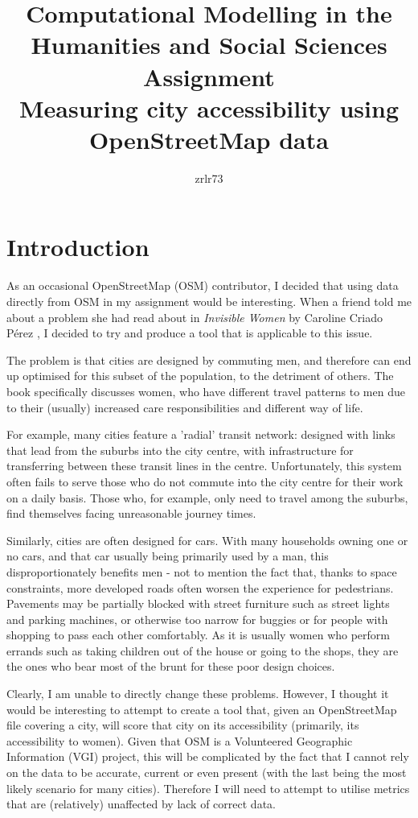 \documentclass[11pt]{article} %
\title{\vspace{-1.6cm}Computational Modelling in the Humanities and Social Sciences Assignment \\
	\vspace{0.5cm}\large Measuring city accessibility using OpenStreetMap data\vspace{-0.3cm}}
\author{zrlr73}
\date{} %
\begin{document}
\maketitle

\section{Introduction}

As an occasional OpenStreetMap (OSM) contributor, I decided that using data directly from OSM in my assignment would be interesting. When a friend told me about a problem she had read about in \textit{Invisible Women} by Caroline Criado Pérez \citeyear{Perez2019}, I decided to try and produce a tool that is applicable to this issue.

The problem is that cities are designed by commuting men, and therefore can end up optimised for this subset of the population, to the detriment of others. The book specifically discusses women, who have different travel patterns to men due to their (usually) increased care responsibilities and different way of life.

For example, many cities feature a 'radial' transit network: designed with links that lead from the suburbs into the city centre, with infrastructure for transferring between these transit lines in the centre. Unfortunately, this system often fails to serve those who do not commute into the city centre for their work on a daily basis. Those who, for example, only need to travel among the suburbs, find themselves facing unreasonable journey times.

Similarly, cities are often designed for cars. With many households owning one or no cars, and that car usually being primarily used by a man, this disproportionately benefits men - not to mention the fact that, thanks to space constraints, more developed roads often worsen the experience for pedestrians. Pavements may be partially blocked with street furniture such as street lights and parking machines, or otherwise too narrow for buggies or for people with shopping to pass each other comfortably. As it is usually women who perform errands such as taking children out of the house or going to the shops, they are the ones who bear most of the brunt for these poor design choices.

Clearly, I am unable to directly change these problems. However, I thought it would be interesting to attempt to create a tool that, given an OpenStreetMap file covering a city, will score that city on its accessibility (primarily, its accessibility to women). Given that OSM is a Volunteered Geographic Information (VGI) project, this will be complicated by the fact that I cannot rely on the data to be accurate, current or even present (with the last being the most likely scenario for many cities). Therefore I will need to attempt to utilise metrics that are (relatively) unaffected by lack of correct data.
\end{document}
